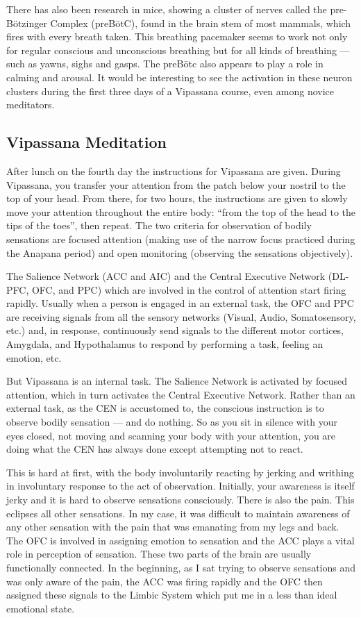 \documentclass[a4paper, amsfonts, amssymb, amsmath, reprint, showkeys, nofootinbib, twoside]{revtex4-1}
\begin{document}
There has also been research in mice, showing a cluster of nerves called the
pre-Bötzinger Complex (preBötC), found in the brain stem of most mammals, which fires
with every breath taken. This breathing pacemaker seems to work not only for regular
conscious and unconscious breathing but for all kinds of breathing --- such as yawns,
sighs and gasps. The preBötc also appears to play a role in calming and
arousal. \cite{prebotcgeneration} It would be interesting to see the activation in
these neuron clusters during the first three days of a Vipassana course, even among
novice meditators.

\subsection{Vipassana Meditation}

After lunch on the fourth day the instructions for Vipassana are given. During
Vipassana, you transfer your attention from the patch below your nostril to the top
of your head. From there, for two hours, the instructions are given to slowly move
your attention throughout the entire body: ``from the top of the head to the tips of
the toes'', then repeat. The two criteria for observation of bodily sensations are
focused attention (making use of the narrow focus practiced during the Anapana
period) and open monitoring (observing the sensations objectively).

The Salience Network (ACC and AIC) and the Central Executive Network (DL-PFC, OFC,
and PPC) which are involved in the control of attention start firing rapidly. Usually
when a person is engaged in an external task, the OFC and PPC are receiving signals
from all the sensory networks (Visual, Audio, Somatosensory, etc.) and, in response,
continuously send signals to the different motor cortices, Amygdala, and Hypothalamus to
respond by performing a task, feeling an emotion, etc.

But Vipassana is an internal task. The Salience Network is activated by focused
attention, which in turn activates the Central Executive Network. Rather than an
external task, as the CEN is accustomed to, the conscious instruction is to observe
bodily sensation --- and do nothing. So as you sit in silence with your eyes closed,
not moving and scanning your body with your attention, you are doing what the CEN has
always done except attempting not to react.

This is hard at first, with the body involuntarily reacting by jerking and writhing
in involuntary response to the act of observation. Initially, your awareness is
itself jerky and it is hard to observe sensations consciously. There is also the
pain. This eclipses all other sensations. In my case, it was difficult to maintain
awareness of any other sensation with the pain that was emanating from my legs and
back. The OFC is involved in assigning emotion to sensation \cite{ofcemotion} and the
ACC plays a vital role in perception of sensation. These two parts of the brain are
usually functionally connected. In the beginning, as I sat trying to observe
sensations and was only aware of the pain, the ACC was firing rapidly and the
OFC then assigned these signals to the Limbic System which 
put me in a less than ideal emotional state.
\end{document}
